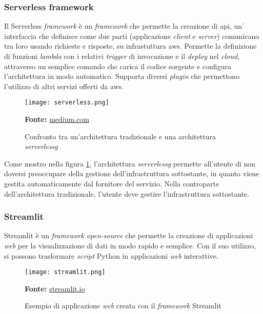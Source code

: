 \subsubsection{Serverless framework}
Il Serverless \textit{framework} è un \textit{framework} che permette la creazione di \gls{api}, un' interfaccia che definisce come due parti (applicazione \textit{client} e \textit{server}) comunicano tra loro usando richieste e risposte, su infrastuttura \gls{aws}. Permette la definizione di funzioni \textit{lambda} con i relativi \textit{trigger} di invocazione e il \textit{deploy} nel \textit{cloud}, attraverso un semplice comando che carica il codice sorgente e configura l'architettura in modo automatico. Supporta diversi \textit{plugin} che permettono l'utilizzo di altri servizi offerti da \gls{aws}.
\begin{figure}[H]
    \centering
    \texttt{[image: serverless.png]}
    \caption{Confronto tra un'architettura tradizionale e una architettura \textit{\gls{serverlessg}}}
    \small \textbf{Fonte:} \href{https://medium.com/canonichq/server-v-s-serverless-architecture-bf3cdab28174}{medium.com}
    \label{fig:Serverless}
\end{figure} 
\noindent
Come mostro nella figura \ref{fig:Serverless}, l'architettura \textit{\gls{serverlessg}} permette all'utente di non doversi preoccupare della gestione dell'infrastruttura sottostante, in quanto viene gestita automaticamente dal fornitore del servizio. Nella controparte dell'architettura tradizionale, l'utente deve gestire l'infrastruttura sottostante.
\subsubsection{Streamlit}
Streamlit è un \textit{framework open-source} che permette la creazione di applicazioni \textit{web} per la visualizzazione di dati in modo rapido e semplice.
Con il suo utilizzo, si possono trasformare \textit{script} Python in applicazioni \textit{web} interattive.
\begin{figure}[H]
    \centering
    \texttt{[image: streamlit.png]}
    \caption{Esempio di applicazione \textit{web} creata con il \textit{framework} Streamlit}
    \small \textbf{Fonte:} \href{https://streamlit.io}{streamlit.io}
    \label{fig:Streamlit}
\end{figure} 

